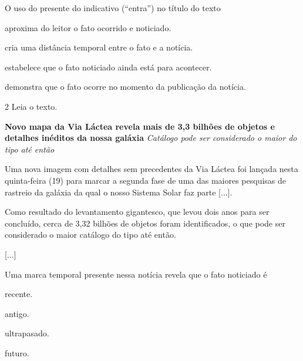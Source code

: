 \pagebreak
\noindent{}O uso do presente do indicativo (“entra”) no título do texto

\begin{escolha}
\item aproxima do leitor o fato ocorrido e noticiado.

\item cria uma distância temporal entre o fato e a notícia.

\item estabelece que o fato noticiado ainda está para acontecer.

\item demonstra que o fato ocorre no momento da publicação da notícia.
\end{escolha}





\num{2} Leia o texto.

\begin{myquote}
\textbf{Novo mapa da Via Láctea revela mais de 3,3 bilhões de objetos e
detalhes inéditos da nossa galáxia}
\textit{Catálogo pode ser considerado o maior do tipo até então}

Uma nova imagem com detalhes sem precedentes da Via Láctea foi lançada
nesta quinta-feira (19) para marcar a segunda fase de uma das maiores
pesquisas de rastreio da galáxia da qual o nosso Sistema Solar faz parte
{[}...{]}.

Como resultado do levantamento gigantesco, que levou dois anos para ser
concluído, cerca de 3,32 bilhões de objetos foram identificados, o que
pode ser considerado o maior catálogo do tipo até então.

{[}...{]}

\end{myquote}

Uma marca temporal presente nessa notícia revela que o fato noticiado é

\begin{minipage}{.5\textwidth}
\begin{escolha}
\item recente.

\item antigo.

\item ultrapasado.

\item futuro.
\end{escolha}
\end{minipage}


